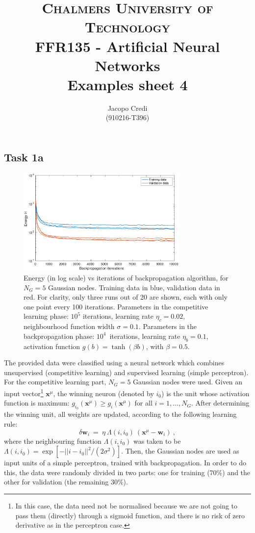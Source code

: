 \documentclass[12pt,titlepage]{article}
\author{Jacopo Credi \\(910216-T396) \\ \vspace*{2cm} }
\title{{\Large \textsc{Chalmers University of Technology}} \\ \bigskip FFR135 - Artificial Neural Networks\\ \bigskip Examples sheet 4 \\ \vspace*{2cm}}
\begin{document}
\parindent=0cm
\maketitle

\subsection*{Task 1a}

\begin{figure}[htbp]
\centering
\includegraphics[width=0.75\textwidth]{1a_energy.pdf}
\caption{Energy (in log scale) vs iterations of backpropagation algorithm, for $N_G = 5$ Gaussian nodes. Training data in blue, validation data in red. For clarity, only three runs out of 20 are shown, each with only one point every 100 iterations. Parameters in the competitive learning phase: $10^5$ iterations, learning rate $\eta_c = 0.02$, neighbourhood function width $\sigma = 0.1$. Parameters in the backpropagation phase: $10^4$~iterations, learning rate $\eta_b = 0.1$, activation function $g(b) = \tanh(\beta b)$, with $\beta = 0.5$.}
\label{1a_energy}
\end{figure}

The provided data were classified using a neural network which combines unsupervised (competitive learning) and supervised learning (simple perceptron).
For the competitive learning part, $N_G = 5$ Gaussian nodes were used. Given an input vector\footnote{In this case, the data need not be normalised because we are not going to pass them (directly) through a sigmoid function, and there is no risk of zero derivative as in the perceptron case.} $\bm{x}^{\mu}$, the winning neuron (denoted by $i_0$) is the unit whose activation function is maximum: $g_{i_0}(\bm{x}^{\mu}) \geq g_{i}(\bm{x}^{\mu})$ for all $i = 1,\ldots,N_G$. After determining the winning unit, all weights are updated, according to the following learning rule:
\[
\delta \bm{w}_i \ = \ \eta \ \Lambda(i,i_0) \ (\bm{x}^{\mu}-\bm{w}_i) \ ,
\]
where the neighbouring function $\Lambda(i,i_0)$ was taken to be $\Lambda(i,i_0) = \exp{[-||i-i_0||^2/(2\sigma^2)]}$. Then, the Gaussian nodes are used as input units of a simple perceptron, trained with backpropagation. In order to do this, the data were randomly divided in two parts: one for training (70\%) and
the other for validation (the remaining 30\%).
\end{document}
